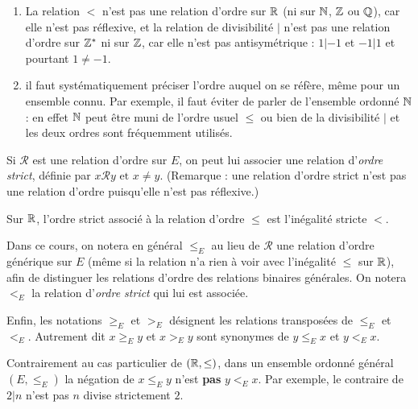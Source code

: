 \begin{attention}
\begin{enumerate}
\item La relation $<$ n'est pas une relation d'ordre sur $\mathbb{R}$ (ni sur $\mathbb{N}$, $\mathbb{Z}$ ou $\mathbb{Q}$), car elle n'est pas réflexive, et la relation de divisibilité $|$ n'est pas une relation d'ordre sur $\mathbb{Z}^*$ ni sur $\mathbb{Z}$, car elle n'est pas antisymétrique : $1|-1$ et $-1|1$ et pourtant $1\neq -1$.
\item il faut systématiquement préciser l'ordre auquel on se réfère, même pour un ensemble \og connu\fg. Par exemple, il faut éviter de parler de \og l'ensemble ordonné $\mathbb{N}$\fg: en effet $\mathbb{N}$ peut être muni de l'ordre usuel $\leq$ ou bien de la divisibilité $|$ et les deux ordres sont fréquemment utilisés.
\end{enumerate}
\end{attention}


\begin{definition}
Si ${\mathcal R}$ est une relation d'ordre sur $E$, on peut lui associer une relation d'\emph{ordre strict}, définie par \og$ x{\mathcal R}y\text{ et }x\neq y$\fg. (Remarque : une relation d'ordre strict n'est pas une relation d'ordre puisqu'elle n'est pas réflexive.)
\end{definition}

\begin{exemple}
Sur $\mathbb{R}$, l'ordre strict associé à la relation d'ordre $\leq$ est l'inégalité stricte $<$.
\end{exemple}


Dans ce cours, on notera en général $\leq_E$ au lieu de ${\mathcal R}$ une relation d'ordre générique sur $E$ (même si la relation n'a rien à voir avec l'inégalité $\leq$ sur $\mathbb{R}$), afin de distinguer les relations d'ordre des relations binaires générales. On notera $<_E$ la relation d'\emph{ordre strict} qui lui est associée.

Enfin, les notations $\geq_E$ et $>_E$ désignent les relations transposées de $\leq_E$ et $<_E$. Autrement dit  $x \geq_E y$ et $x >_E y$ sont synonymes de $y \leq_E x$ et $y <_E x$.

\begin{attention}
Contrairement au cas particulier de $(\mathbb{R},\leq)$, dans un ensemble ordonné général $(E,\leq_E)$ la négation de \og $x\leq_E y$\fg{} n'est \textbf{pas} \og $y<_E x$\fg. Par exemple, le contraire de \og$2|n$\fg{} n'est pas \og$n$ divise strictement $2$.\fg{}
\end{attention}

